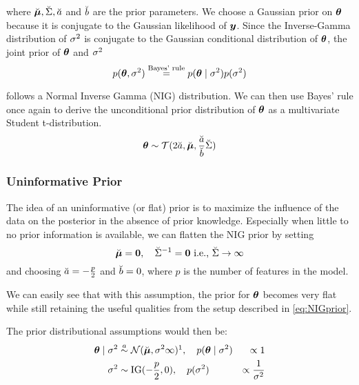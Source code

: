 where $\breve{\bm{\mu}}, \breve{\Sigma}, \breve{a}$ and $\breve{b}$ are the prior parameters.
We choose a Gaussian prior on $\bm{\theta}$ because it is conjugate to the Gaussian likelihood of $\bm{y}$.
Since the Inverse-Gamma distribution of $\sigma^2$ is conjugate to the Gaussian conditional distribution of $\bm{\theta}$, the joint prior of $\bm{\theta}$ and $\sigma^2$
\begin{equation*}
    p(\bm{\theta}, \sigma^2) \overset{\text{Bayes' rule}}{=} p(\bm{\theta} \mid \sigma^2) p(\sigma^2)
\end{equation*}

follows a Normal Inverse Gamma (NIG) distribution.
We can then use Bayes' rule once again to derive the unconditional prior distribution of $\bm{\theta}$ as a multivariate Student t-distribution.
\begin{equation*}
    \bm{\theta} \sim \mathcal{T}(2 \breve{a}, \breve{\bm{\mu}}, \frac{\breve{a}}{\breve{b}} \breve{\Sigma})
\end{equation*}

\subsubsection*{Uninformative Prior}
The idea of an uninformative (or flat) prior is to maximize the influence of the data on the posterior in the absence of prior knowledge.
Especially when little to no prior information is available, we can flatten the NIG prior by setting
\begin{equation*}
    \breve{\bm{\mu}} = \bm{0}, \quad \breve{\Sigma}^{-1} = \bm{0} \text{  i.e., } \breve{\Sigma} \to \infty 
\end{equation*}
and choosing $\breve{a} = - \frac{p}{2}$ and $\breve{b} = 0$, where $p$ is the number of features in the model.

We can easily see that with this assumption, the prior for $\bm{\theta}$ becomes very flat while still retaining the useful qualities from the setup described in \autoref{eq:NIGprior}.

The prior distributional assumptions would then be:
\begin{equation} \label{eq:flat-prior}
    \begin{aligned}
        \btheta \mid \ssd &\overset{a}{\sim}  \Ncal(\mupri, \ssd \infty)\footnotemark, \quad p(\btheta\mid \ssd) &\propto 1\\
        \ssd &\sim \IG(-\frac{p}{2},  0), \quad p(\ssd) &\propto \frac{1}{\ssd}
    \end{aligned}
\end{equation}


